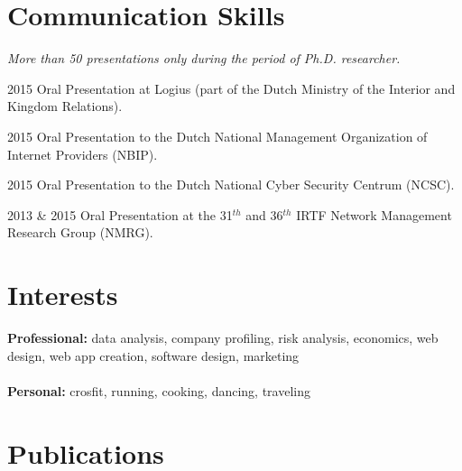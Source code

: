 \documentclass[]{friggeri-cv} %
\begin{document}
\section{Communication Skills}
\emph{More than 50 presentations only during the period of Ph.D. researcher.}

\begin{entrylist}

\entry
{2015}
{Oral Presentation}
{at Logius (part of the Dutch Ministry of the Interior and Kingdom Relations).}

\entry
{2015}
{Oral Presentation}
{to the Dutch National Management Organization of Internet Providers (NBIP).}

\entry
{2015}
{Oral Presentation}
{to the Dutch National Cyber Security Centrum (NCSC).}

\entry
{2013 \& 2015}
{Oral Presentation}
{at the 31$^{th}$ and 36$^{th}$ IRTF Network Management Research Group (NMRG).}

\end{entrylist}

\section{Interests}
\textbf{Professional:} data analysis, company profiling, risk analysis, economics, web design, web app creation, software design, marketing\\ \\ \textbf{Personal:} crosfit, running, cooking, dancing, traveling

\section{Publications}


\begin{refsection} %
\nocite{*}
\printbibliography[sorting=chronological, type=inproceedings, title={international peer-reviewed conferences/proceedings}, notkeyword={france}, heading=bibheading]
\end{refsection}

\begin{refsection} %
\nocite{*}
\printbibliography[sorting=chronological, type=inproceedings, title={local peer-reviewed conferences/proceedings}, keyword={france}, heading=bibheading]
\end{refsection}


\end{document}
